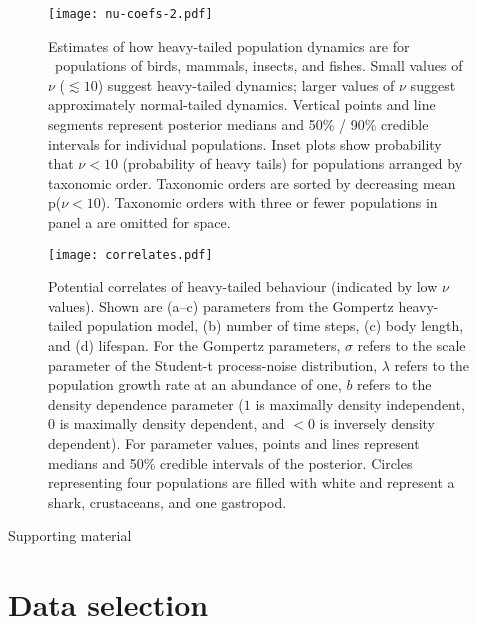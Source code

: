 \documentclass[12pt]{article}
\begin{document}
\clearpage

\begin{figure}[htbp]
\begin{center}
\texttt{[image: nu-coefs-2.pdf]}
\caption{
Estimates of how heavy-tailed population dynamics are for \nuCoefPopN\ populations of birds, mammals, insects, and fishes. Small values of $\nu$ ($\lesssim 10$) suggest heavy-tailed dynamics; larger values of $\nu$ suggest approximately normal-tailed dynamics. Vertical points and line segments represent posterior medians and 50\% / 90\% credible intervals for individual populations. Inset plots show probability that $\nu < 10$ (probability of heavy tails) for populations arranged by taxonomic order. Taxonomic orders are sorted by decreasing mean p($\nu < 10$).
Taxonomic orders with three or fewer populations in panel a are omitted for space.}\label{fig:nu-coefs}
\end{center}
\end{figure}

\clearpage

\begin{figure}[htbp]
\begin{center}
\texttt{[image: correlates.pdf]}
\caption{
Potential correlates of heavy-tailed behaviour (indicated by low $\nu$ values). Shown are (a--c) parameters from the Gompertz heavy-tailed population model, (b) number of time steps, (c) body length, and (d) lifespan.
For the Gompertz parameters, $\sigma$ refers to the scale parameter of the Student-t process-noise distribution, $\lambda$ refers to the population growth rate at an abundance of one, $b$ refers to the density dependence parameter ($1$ is maximally density independent, $0$ is maximally density dependent, and $<0$ is inversely density dependent).
For parameter values, points and lines represent medians and 50\% credible intervals of the posterior.
Circles representing four populations are filled with white and represent a shark, crustaceans, and one gastropod.
}
\label{fig:correlates}
\end{center}
\end{figure}

\clearpage

\begin{centering}
\LARGE
Supporting material\\[1.5em]
\end{centering}

\section{Data selection}
\end{document}
